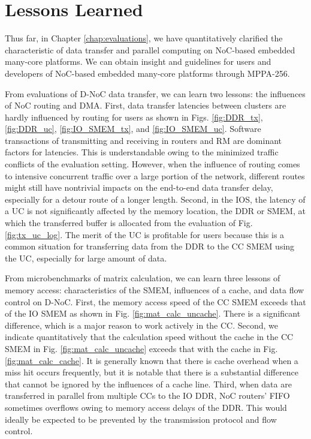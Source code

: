 \section{Lessons Learned}
\label{sec:lessons}
Thus far, in Chapter \ref{chap:evaluations}, we have quantitatively clarified the characteristic of data transfer and parallel computing on NoC-based embedded many-core platforms.
We can obtain insight and guidelines for users and developers of NoC-based embedded many-core platforms through MPPA-256.

From evaluations of D-NoC data transfer, we can learn two lessons: the influences of NoC routing and DMA.
First, data transfer latencies between clusters are hardly influenced by routing for users as shown in Figs. \ref{fig:DDR_tx}, \ref{fig:DDR_uc}, \ref{fig:IO_SMEM_tx}, and \ref{fig:IO_SMEM_uc}.
Software transactions of transmitting and receiving in routers and RM are dominant factors for latencies.
This is understandable owing to the minimized traffic conflicts of the evaluation setting.
However, when the influence of routing comes to intensive concurrent traffic over a large portion of the network, different routes might still have nontrivial impacts on the end-to-end data transfer delay, especially for a detour route of a longer length.
Second, in the IOS, the latency of a UC is not significantly affected by the memory location, the DDR or SMEM, at which the transferred buffer is allocated from the evaluation of Fig. \ref{fig:tx_uc_log}.
The merit of the UC is profitable for users because this is a common situation for transferring data from the DDR to the CC SMEM using the UC, especially for large amount of data.

From microbenchmarks of matrix calculation, we can learn three lessons of memory access: characteristics of the SMEM, influences of a cache, and data flow control on D-NoC.
First, the memory access speed of the CC SMEM exceeds that of the IO SMEM as shown in Fig. \ref{fig:mat_calc_uncache}.
There is a significant difference, which is a major reason to work actively in the CC.
Second, we indicate quantitatively that the calculation speed without the cache in the CC SMEM in Fig. \ref{fig:mat_calc_uncache} exceeds that with the cache in Fig. \ref{fig:mat_calc_cache}.
It is generally known that there is cache overhead when a miss hit occurs frequently, but it is notable that there is a substantial difference that cannot be ignored by the influences of a cache line.
Third, when data are transferred in parallel from multiple CCs to the IO DDR, NoC routers' FIFO sometimes overflows owing to memory access delays of the DDR.
This would ideally be expected to be prevented by the transmission protocol and flow control.

